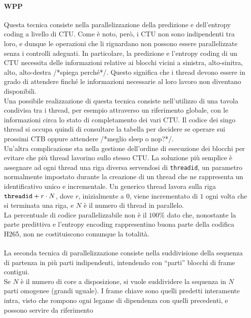 \paragraph*{WPP} Questa tecnica consiste nella parallelizzazione della 
predizione e 
dell'entropy coding a livello di CTU. Come è noto, però, i CTU non sono 
indipendenti tra loro, e dunque le operazioni che li riguardano non possono 
essere parallelizzate senza i controlli adeguati. In particolare, la predizione 
e l'entropy coding di un CTU necessita delle informazioni relative ai blocchi 
vicini a sinistra, alto-sinitra, alto, alto-destra /*spiega perché*/. Questo 
significa che i thread devono essere in grado di attendere finché le 
informazioni necessarie al loro lavoro non diventano disponibili. \\
Una possibile realizzazione di questa tecnica consiste nell'utilizzo di una 
tavola condivisa tra i thread, per esempio attraverso un riferimento globale, 
con le informazioni circa lo stato di completamento dei vari CTU. Il codice dei 
singo thread si occupa quindi di consultare la tabella per decidere se operare 
sui prossimi CTB oppure attendere /*meglio sleep o nop?*/.\\
Un'altra complicazione sta nella gestione dell'ordine di esecuzione dei blocchi 
per evitare che più thread lavorino sullo stesso CTU. La soluzione più semplice 
è assegnare ad ogni thread una riga diversa servendosi di \verb|threadid|, un 
parametro normalmente impostato durante la creazione di un thread che ne 
rappresenta un identificativo unico e incrementale. Un generico thread lavora 
sulla riga $\verb|threadid| + r \cdot N$, dove $r$, inizialmente a $0$, viene 
incrementato di $1$ ogni volta che si terminata una riga, e $N$ è il numero di 
thread in parallelo.  \\
La percentuale di codice parallelizzabile non è il $100\%$ dato che, nonostante 
la parte predittiva e l'entropy encoding rappresentino buona parte della 
codifica H265, non ne costituiscono comunque la totalità.
\\ \\
La seconda tecnica di parallelizzazione consiste nella 
suddivisione della sequenza di partenza in più parti indipendenti, intendendo 
con ``parti'' blocchi di frame contigui.\\
Se $N$ è il numero di core a disposizione, 
si vuole suddividere la sequenza in $N$ parti omogenee (grandi uguale). I frame 
chiave sono quelli predetti interamente intra, visto che rompono ogni 
legame di dipendenza con quelli precedenti, e possono servire da riferimento 
